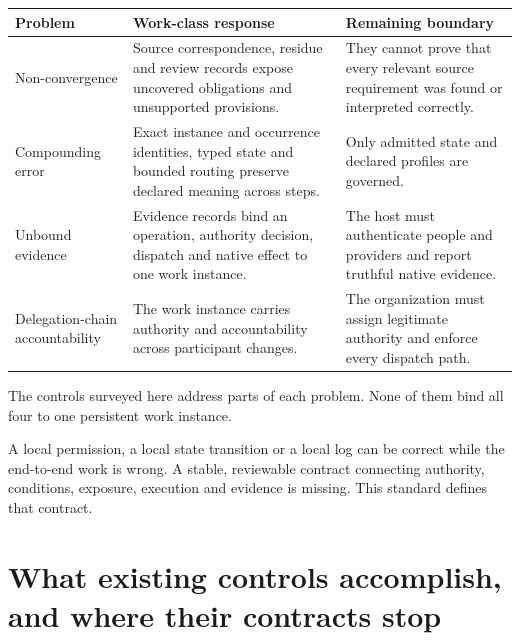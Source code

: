 \documentclass[
  american,
  11pt,
  letterpaper,
]{article}
\newcounter{none} %
\begin{document}
{\def\LTcaptype{none} %
\begin{longtable}[]{@{}
  >{\raggedright\arraybackslash}p{}
  >{\raggedright\arraybackslash}p{}
  >{\raggedright\arraybackslash}p{}@{}}
\toprule\noalign{}
\begin{minipage}[b]{\linewidth}\raggedright
Problem
\end{minipage} & \begin{minipage}[b]{\linewidth}\raggedright
Work-class response
\end{minipage} & \begin{minipage}[b]{\linewidth}\raggedright
Remaining boundary
\end{minipage} \\
\midrule\noalign{}
\endhead
\bottomrule\noalign{}
\endlastfoot
Non-convergence & Source correspondence, residue and review records
expose uncovered obligations and unsupported provisions. & They cannot
prove that every relevant source requirement was found or interpreted
correctly. \\
Compounding error & Exact instance and occurrence identities, typed
state and bounded routing preserve declared meaning across steps. & Only
admitted state and declared profiles are governed. \\
Unbound evidence & Evidence records bind an operation, authority
decision, dispatch and native effect to one work instance. & The host
must authenticate people and providers and report truthful native
evidence. \\
Delegation-chain accountability & The work instance carries authority
and accountability across participant changes. & The organization must
assign legitimate authority and enforce every dispatch path. \\
\end{longtable}
}

The controls surveyed here address parts of each problem. None of them
bind all four to one persistent work instance.

A local permission, a local state transition or a local log can be
correct while the end-to-end work is wrong. A stable, reviewable
contract connecting authority, conditions, exposure, execution and
evidence is missing. This standard defines that contract.

\section{What existing controls accomplish, and where their contracts
stop}\label{what-existing-controls-accomplish-and-where-their-contracts-stop}
\end{document}
